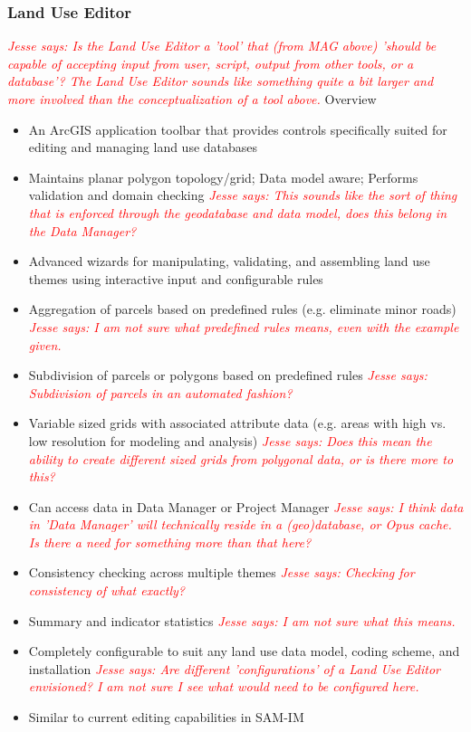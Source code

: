 \documentclass[titlepage]{article}
\begin{document}
\subsubsection{Land Use Editor}
\textcolor{red}{\textit{Jesse says: Is the Land Use Editor a 'tool' that (from MAG above) 'should be capable of accepting input from user, script, output from other tools, or a database'?  The Land Use Editor sounds like something quite a bit larger and more involved than the conceptualization of a tool above.}}
Overview
\begin{itemize}
	\item An ArcGIS application toolbar that provides controls specifically suited for editing and managing land use databases
	\item Maintains planar polygon topology/grid; Data model aware; Performs validation and domain checking
		\textcolor{red}{\textit{Jesse says: This sounds like the sort of thing that is enforced through the geodatabase and data model, does this belong in the Data Manager?}}
	\item Advanced wizards for manipulating, validating, and assembling land use themes using interactive input and configurable rules
	\item Aggregation of parcels based on predefined rules (e.g. eliminate minor roads)
		\textcolor{red}{\textit{Jesse says: I am not sure what predefined rules means, even with the example given.}}
	\item Subdivision of parcels or polygons based on predefined rules
		\textcolor{red}{\textit{Jesse says: Subdivision of parcels in an automated fashion?}}
	\item Variable sized grids with associated attribute data (e.g. areas with high vs. low resolution for modeling and analysis)
		\textcolor{red}{\textit{Jesse says: Does this mean the ability to create different sized grids from polygonal data, or is there more to this?}}
	\item Can access data in Data Manager or Project Manager
		\textcolor{red}{\textit{Jesse says: I think data in 'Data Manager' will technically reside in a (geo)database, or Opus cache.  Is there a need for something more than that here?}}
	\item Consistency checking across multiple themes
		\textcolor{red}{\textit{Jesse says: Checking for consistency of what exactly?}}
	\item Summary and indicator statistics
		\textcolor{red}{\textit{Jesse says: I am not sure what this means.}}
	\item Completely configurable to suit any land use data model, coding scheme, and installation
		\textcolor{red}{\textit{Jesse says: Are different 'configurations' of a Land Use Editor envisioned?  I am not sure I see what would need to be configured here.}}
	\item Similar to current editing capabilities in SAM-IM
\end{itemize}
\end{document}
